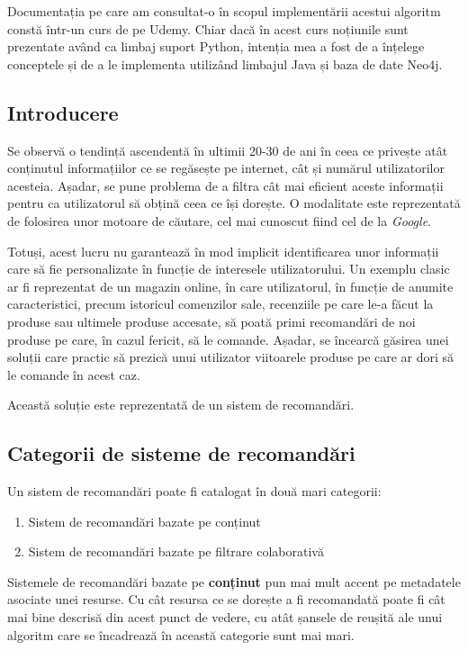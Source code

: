 \documentclass[12pt,a4paper]{report}
\begin{document}
Documentația pe care am consultat-o în scopul implementării acestui algoritm constă într-un curs de pe Udemy. \cite{27} Chiar dacă în acest curs noțiunile sunt prezentate având ca limbaj suport Python, intenția mea a fost de a înțelege conceptele și de a le implementa utilizând limbajul Java și baza de date Neo4j.

\subsection{Introducere}

Se observă o tendință ascendentă în ultimii 20-30 de ani în ceea ce privește atât conținutul informațiilor ce se regăsește pe internet, cât și numărul utilizatorilor acesteia. \cite{28} Așadar, se pune problema de a filtra cât mai eficient aceste informații pentru ca utilizatorul să obțină ceea ce își dorește. O modalitate este reprezentată de folosirea unor motoare de căutare, cel mai cunoscut fiind cel de la \emph{Google}. \cite{5}

Totuși, acest lucru nu garantează în mod implicit identificarea unor informații care să fie personalizate în funcție de interesele utilizatorului. Un exemplu clasic ar fi reprezentat de un magazin online, în care utilizatorul, în funcție de anumite caracteristici, precum istoricul comenzilor sale, recenziile pe care le-a făcut la produse sau ultimele produse accesate, să poată primi recomandări de noi produse pe care, în cazul fericit, să le comande. Așadar, se încearcă găsirea unei soluții care practic să prezică unui utilizator viitoarele produse pe care ar dori să le comande în acest caz.

Această soluție este reprezentată de un sistem de recomandări.

\subsection{Categorii de sisteme de recomandări}

Un sistem de recomandări poate fi catalogat în două mari categorii:

\begin{enumerate}
  \item Sistem de recomandări bazate pe conținut
  \item Sistem de recomandări bazate pe filtrare colaborativă
\end{enumerate}

Sistemele de recomandări bazate pe \textbf{conținut} pun mai mult accent pe metadatele asociate unei resurse. Cu cât resursa ce se dorește a fi recomandată poate fi cât mai bine descrisă din acest punct de vedere, cu atât șansele de reușită ale unui algoritm care se încadrează în această categorie sunt mai mari. 
\end{document}
